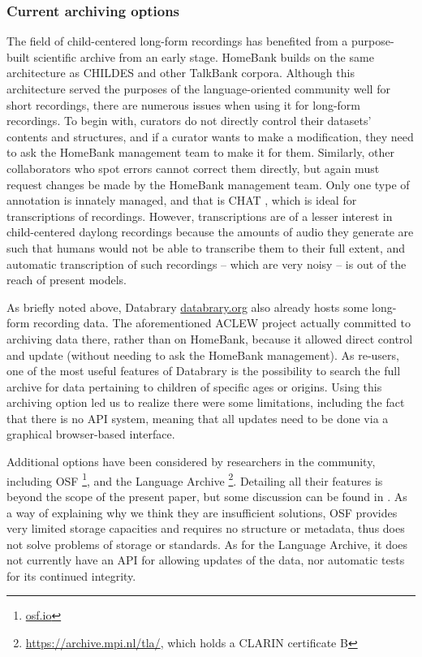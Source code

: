\documentclass[smallextended]{svjour3}       %
\begin{document}
\subsubsection*{Current archiving options}

The field of child-centered long-form recordings has benefited from a purpose-built scientific archive from an early stage. HomeBank \cite{vandam2016homebank} builds on the same architecture as CHILDES \cite{MacWhinney2000} and other TalkBank corpora. Although this architecture served the purposes of the language-oriented community well for short recordings, there are numerous issues when using it for long-form recordings. To begin with, curators do not directly control their datasets' contents and structures, and if a curator wants to make a modification, they need to ask the HomeBank management team to make it for them. Similarly, other collaborators who spot errors cannot correct them directly, but again must request changes be made by the HomeBank management team.  Only one type of annotation is innately managed, and that is CHAT \cite{MacWhinney2000}, which is ideal for transcriptions of  recordings. However, transcriptions are of a lesser interest in child-centered daylong recordings because the amounts of audio they generate are such that humans would not be able to transcribe them to their full extent, and automatic transcription of such recordings -- which are very noisy -- is out of the reach of present models.

As briefly noted above, Databrary \url{databrary.org} also already hosts some long-form recording data. The aforementioned ACLEW project actually committed to archiving data there, rather than on HomeBank, because it allowed direct control and update (without needing to ask the HomeBank management).  As re-users, one of the most useful features of Databrary is the possibility to search the full archive for data pertaining to children of specific ages or origins. Using this archiving option led us to realize there were some limitations, including the fact that there is no API system, meaning that all updates need to be done via a graphical browser-based interface.

Additional options have been considered by researchers in the community, including OSF \footnote{\url{osf.io}}, and the Language Archive \footnote{\url{https://archive.mpi.nl/tla/}, which holds a CLARIN certificate B}. Detailing all their features is beyond the scope of the present paper, but some discussion can be found in \cite{casillas2019step}. As a way of explaining why we think they are insufficient solutions, OSF provides very limited storage capacities and requires no structure or metadata, thus does not solve problems of storage or standards. As for the Language Archive, it does not currently have an API for allowing updates of the data, nor automatic tests for its continued integrity.
\end{document}
